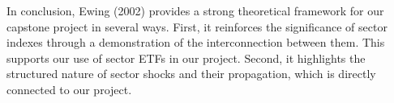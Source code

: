 \documentclass{article}
\begin{document}
\noindent In conclusion, Ewing (2002) provides a strong theoretical framework for our capstone project in several ways. First, it reinforces the significance of sector indexes through a demonstration of the interconnection between them. This supports our use of sector ETFs in our project. Second, it highlights the structured nature of sector shocks and their propagation, which is directly connected to our project.
\end{document}
